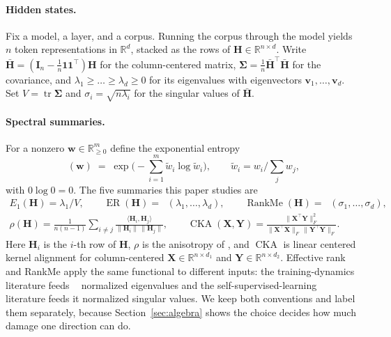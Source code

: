 \documentclass{article}
\theoremstyle{spaced}
\theoremstyle{definition}
\DeclareMathOperator{\ER}{ER}
\DeclareMathOperator{\RankMe}{RankMe}
\DeclareMathOperator{\CKA}{CKA}
\DeclareMathOperator{\Hexp}{H_{\exp}}
\DeclareMathOperator{\tr}{tr}
\newcommand{\bH}{\mathbf{H}}
\newcommand{\bv}{\mathbf{v}}
\newcommand{\bw}{\mathbf{w}}
\newcommand{\bX}{\mathbf{X}}
\newcommand{\bY}{\mathbf{Y}}
\newcommand{\bI}{\mathbf{I}}
\newcommand{\bSig}{\boldsymbol{\Sigma}}
\begin{document}
\paragraph{Hidden states.} Fix a model, a layer, and a corpus. Running the corpus through the model yields $n$ token representations in $\mathbb{R}^d$, stacked as the rows of $\bH \in \mathbb{R}^{n \times d}$. Write $\bar{\bH} = (\bI_n - \tfrac{1}{n}\mathbf{1}\mathbf{1}^\top)\bH$ for the column-centered matrix, $\bSig = \tfrac{1}{n}\bar{\bH}^\top\bar{\bH}$ for the covariance, and $\lambda_1 \ge \dots \ge \lambda_d \ge 0$ for its eigenvalues with eigenvectors $\bv_1,\dots,\bv_d$. Set $V = \tr\bSig$ and $\sigma_i = \sqrt{n\lambda_i}$ for the singular values of $\bar{\bH}$.

\paragraph{Spectral summaries.} For a nonzero $\bw \in \mathbb{R}^m_{\ge 0}$ define the exponential entropy
\begin{equation}
\label{eq:hexp}
\Hexp(\bw) \;=\; \exp\Big(-\sum_{i=1}^{m} \tilde{w}_i \log \tilde{w}_i\Big), \qquad \tilde{w}_i = w_i / \textstyle\sum_j w_j ,
\end{equation}
with $0\log 0 = 0$. The five summaries this paper studies are
\begin{equation}
\label{eq:defs}
\begin{gathered}
E_1(\bH) = \lambda_1 / V , \qquad
\ER(\bH) = \Hexp(\lambda_1,\dots,\lambda_d) , \qquad
\RankMe(\bH) = \Hexp(\sigma_1,\dots,\sigma_d) , \\[4pt]
\rho(\bH) = \frac{1}{n(n-1)}\sum_{i \ne j} \frac{\langle \bH_i, \bH_j\rangle}{\|\bH_i\|\,\|\bH_j\|}, \qquad
\CKA(\bX,\bY) = \frac{\|\bX^\top \bY\|_F^2}{\|\bX^\top\bX\|_F \, \|\bY^\top\bY\|_F} .
\end{gathered}
\end{equation}
Here $\bH_i$ is the $i$-th row of $\bH$, $\rho$ is the anisotropy of \citet{ethayarajh2019contextual}, and $\CKA$ is linear centered kernel alignment \citep{kornblith2019similarity} for column-centered $\bX \in \mathbb{R}^{n \times d_1}$ and $\bY \in \mathbb{R}^{n \times d_2}$. Effective rank \citep{roy2007effective} and RankMe \citep{garrido2023rankme} apply the same functional to different inputs: the training-dynamics literature feeds $\Hexp$ normalized eigenvalues and the self-supervised-learning literature feeds it normalized singular values. We keep both conventions and label them separately, because Section~\ref{sec:algebra} shows the choice decides how much damage one direction can do.
\end{document}
